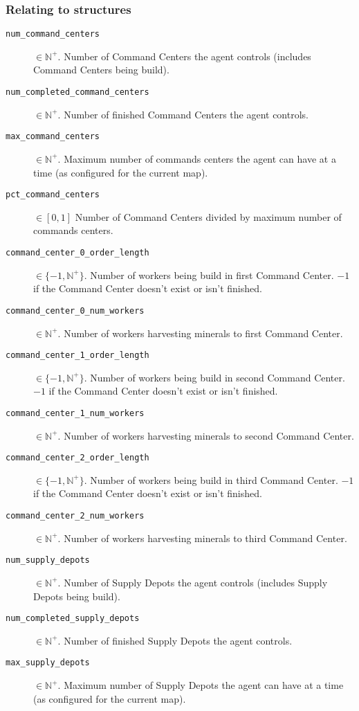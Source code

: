 \subsubsection*{Relating to structures}
\begin{description}
    \item[\texttt{num\_command\_centers}] $\in \mathbb{N}^+$. Number of Command Centers the agent controls (includes Command Centers being build).
    \item[\texttt{num\_completed\_command\_centers}] $\in \mathbb{N}^+$. Number of finished Command Centers the agent controls.
    \item[\texttt{max\_command\_centers}] $\in \mathbb{N}^+$. Maximum number of commands centers the agent can have at a time (as configured for the current map).
    \item[\texttt{pct\_command\_centers}] $\in [0,1]$ Number of Command Centers divided by maximum number of commands centers.
    \item[\texttt{command\_center\_0\_order\_length}] $\in \{-1, \mathbb{N}^+\}$. Number of workers being build in first Command Center. $-1$ if the Command Center doesn't exist or isn't finished.
    \item[\texttt{command\_center\_0\_num\_workers}] $\in \mathbb{N}^+$. Number of workers harvesting minerals to first Command Center.
    \item[\texttt{command\_center\_1\_order\_length}] $\in \{-1, \mathbb{N}^+\}$. Number of workers being build in second Command Center. $-1$ if the Command Center doesn't exist or isn't finished.
    \item[\texttt{command\_center\_1\_num\_workers}] $\in \mathbb{N}^+$. Number of workers harvesting minerals to second Command Center.
    \item[\texttt{command\_center\_2\_order\_length}] $\in \{-1, \mathbb{N}^+\}$. Number of workers being build in third Command Center. $-1$ if the Command Center doesn't exist or isn't finished.
    \item[\texttt{command\_center\_2\_num\_workers}] $\in \mathbb{N}^+$. Number of workers harvesting minerals to third Command Center.
    \item[\texttt{num\_supply\_depots}] $\in \mathbb{N}^+$. Number of Supply Depots the agent controls (includes Supply Depots being build).
    \item[\texttt{num\_completed\_supply\_depots}] $\in \mathbb{N}^+$. Number of finished Supply Depots the agent controls.
    \item[\texttt{max\_supply\_depots}] $\in \mathbb{N}^+$. Maximum number of Supply Depots the agent can have at a time (as configured for the current map).

\end{description}
